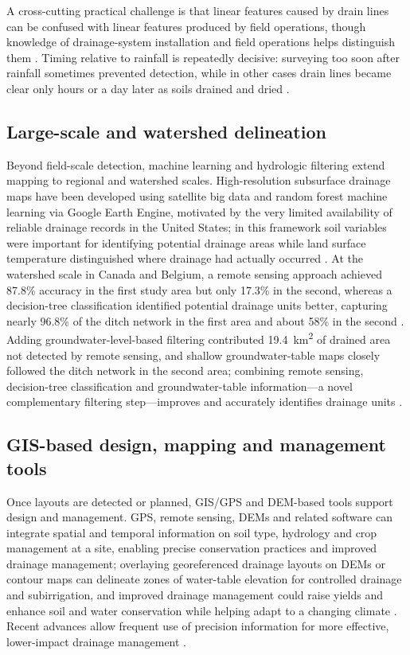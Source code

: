 A cross-cutting practical challenge is that linear features caused by drain lines can be confused with linear features produced by field operations, though knowledge of drainage-system installation and field operations helps distinguish them \parencite{Allred2020}. Timing relative to rainfall is repeatedly decisive: surveying too soon after rainfall sometimes prevented detection, while in other cases drain lines became clear only hours or a day later as soils drained and dried \parencite{Allred2020}.

\subsection{Large-scale and watershed delineation}

Beyond field-scale detection, machine learning and hydrologic filtering extend mapping to regional and watershed scales. High-resolution subsurface drainage maps have been developed using satellite big data and random forest machine learning via Google Earth Engine, motivated by the very limited availability of reliable drainage records in the United States; in this framework soil variables were important for identifying potential drainage areas while land surface temperature distinguished where drainage had actually occurred \parencite{Cho2019}. At the watershed scale in Canada and Belgium, a remote sensing approach achieved 87.8\% accuracy in the first study area but only 17.3\% in the second, whereas a decision-tree classification identified potential drainage units better, capturing nearly 96.8\% of the ditch network in the first area and about 58\% in the second \parencite{Yimer2023}. Adding groundwater-level-based filtering contributed 19.4~km\textsuperscript{2} of drained area not detected by remote sensing, and shallow groundwater-table maps closely followed the ditch network in the second area; combining remote sensing, decision-tree classification and groundwater-table information---a novel complementary filtering step---improves and accurately identifies drainage units \parencite{Yimer2023}.

\subsection{GIS-based design, mapping and management tools}

Once layouts are detected or planned, GIS/GPS and DEM-based tools support design and management. GPS, remote sensing, DEMs and related software can integrate spatial and temporal information on soil type, hydrology and crop management at a site, enabling precise conservation practices and improved drainage management; overlaying georeferenced drainage layouts on DEMs or contour maps can delineate zones of water-table elevation for controlled drainage and subirrigation, and improved drainage management could raise yields and enhance soil and water conservation while helping adapt to a changing climate \parencite{Shedekar2018}. Recent advances allow frequent use of precision information for more effective, lower-impact drainage management \parencite{Shedekar2018}.

